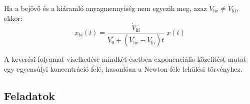 \documentclass{szb-practice}
\begin{document}
\begin{blueBox}
\begin{minipage}[c]{.5\textwidth}
    Ha a bejövő és a kiáramló anyagmennyiség nem egyezik meg,
    azaz $\dot{V}_\text{be} \neq \dot{V}_\text{ki}$, ekkor:
    $$
      x_\text{ki}(t) = \frac{\dot{V}_\text{ki}}{V_0 + (\dot{V}_\text{be} - \dot{V}_\text{ki})t} \; x(t)
    $$
  \end{minipage}

  \vspace{1em}

  A keverési folyamat viselkedése mindkét esetben exponenciális közelítést mutat
  egy egyensúlyi koncentráció felé, hasonlóan a Newton-féle lehűlési törvényhez.
\end{blueBox}

\clearpage
\subsection{Feladatok}
\end{document}
